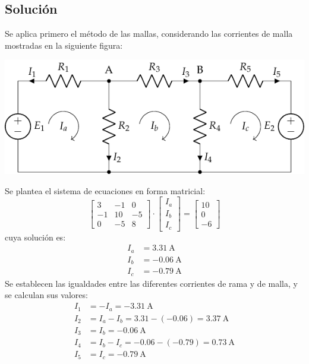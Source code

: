 \subsection*{Solución}
Se aplica primero el método de las mallas, considerando las corrientes
de malla mostradas en la siguiente figura:
\begin{center}
  \includegraphics{figuras/BT1_08_mallas.pdf}
\end{center}

Se plantea el sistema de ecuaciones en forma matricial:
\begin{equation*}
  \begin{bmatrix}
    3 & -1 & 0 \\
    -1 & 10 & -5 \\
    0 & -5 & 8
  \end{bmatrix} \cdot
  \begin{bmatrix}
    I_a\\
    I_b\\
    I_c
  \end{bmatrix} = %
  \begin{bmatrix}
    10 \\
    0\\
    -6
  \end{bmatrix}
\end{equation*}
cuya solución es:
\begin{align*}
  I_a&=\qty{3.31}{\ampere}\\
  I_b&=\qty{-0.06}{\ampere}\\
  I_c&= \qty{-0.79}{\ampere}
\end{align*}
Se establecen las igualdades entre las diferentes corrientes de rama y
de malla, y se calculan sus valores:
\begin{align*}
  I_1&=-I_a=\qty{-3.31}{\ampere}\\
  I_2&=I_a-I_b=3.31-(-0.06)=\qty{3.37}{\ampere}\\
  I_3&=I_b=\qty{-0.06}{\ampere}\\
  I_4&=I_b-I_c=-0.06-(-0.79)=\qty{0.73}{\ampere}\\
  I_5&=I_c=\qty{-0.79}{\ampere}
\end{align*}
	
